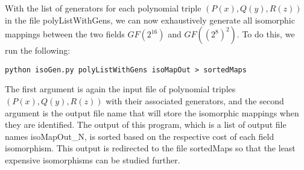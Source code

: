 \documentclass[11pt]{article}
\begin{document}
With the list of generators for each polynomial triple $(P(x), Q(y), R(z))$
in the file polyListWithGens, we can now exhaustively generate all isomorphic mappings
between the two fields $GF(2^16)$ and $GF((2^8)^2)$. To do this, we run the following:
\begin{center}
{\tt python isoGen.py polyListWithGens isoMapOut > sortedMaps}
\end{center}
The first argument is again the input file of polynomial triples $(P(x), Q(y), R(z))$
with their associated generators, and the second argument is the output file name
that will store the isomorphic mappings when they are identified. The output
of this program, which is a list of output file names isoMapOut\_N, is sorted
based on the respective cost of each field isomorphism. This output is redirected
to the file sortedMaps so that the least expensive isomorphisms can be studied further.
\end{document}

